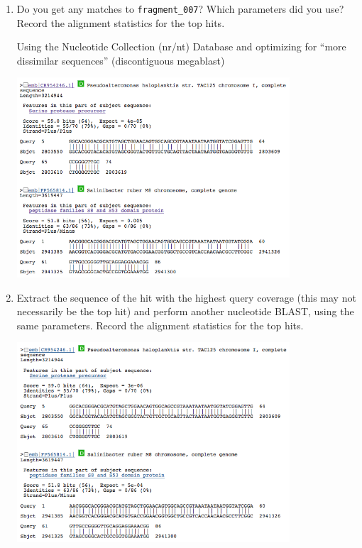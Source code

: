 \documentclass[a4paper,11pt]{article}
\begin{document}
\begin{enumerate}
\item Do you get any matches to \texttt{fragment\_007}? Which parameters did you use? Record the alignment statistics for the top hits.

Using the Nucleotide Collection (nr/nt) Database and optimizing for ``more dissimilar sequences''
(discontiguous megablast)

\vspace{0.5cm}
\begin{center}
\includegraphics[width=0.8\textwidth]{blastn1.png}
\end{center}
\vspace{0.5cm}

\item Extract the sequence of the hit with the highest query coverage (this may not necessarily be the top hit) and perform another nucleotide BLAST, using the same parameters. Record the alignment statistics for the top hits.

\vspace{0.5cm}
\begin{center}
\includegraphics[width=0.8\textwidth]{blastn2.png}
\end{center}
\vspace{0.5cm}


\end{enumerate}
\end{document}

